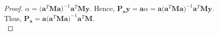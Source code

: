 \begin{notechapter}
\begin{proof}
    $\alpha = \big( {\textbf{a}}^T \textbf{M} \textbf{a} \big)^{-1} 
    {\textbf{a}}^T \textbf{M}  \textbf{y}$. Hence, $\textbf{P}_{\textbf{a}} \textbf{y} = 
    \textbf{a} \alpha = 
    \textbf{a} \big( {\textbf{a}}^T \textbf{M} \textbf{a} \big)^{-1} {\textbf{a}}^T \textbf{M} \textbf{y}$.\\

    Thus, $\textbf{P}_{\textbf{a}} = \textbf{a} \big( {\textbf{a}}^T \textbf{M} \textbf{a} \big)^{-1} {\textbf{a}}^T \textbf{M}$.\\



\end{proof}
\end{notechapter}
